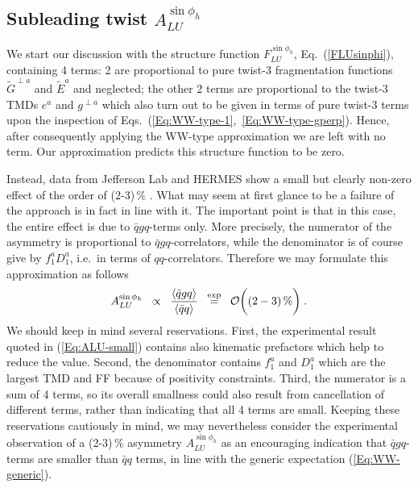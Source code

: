 \documentclass[a4paper,11pt]{article}
\newcommand{\be}{\begin{equation}}
\newcommand{\ee}{\end{equation}}
\newcommand{\la}{\langle}
\newcommand{\ra}{\rangle}
\begin{document}
\subsection{\boldmath Subleading twist  $A_{LU}^{\sin\phi_h}$}
\label{Sec-7.1:FLU}

We start our discussion with the structure function $F_{LU}^{\sin\phi_h}$,
Eq.~(\ref{FLUsinphi}), containing 4 terms: 
2 are proportional to pure twist-3 fragmentation functions 
$\tilde{G}^{\perp a}$ and $\tilde{E}^a$ and neglected; the other 2
terms are proportional to the twist-3 TMDs $e^a$ and $g^{\perp a}$ which
also turn out to be given in terms of pure twist-3 terms upon the 
inspection of Eqs.~(\ref{Eq:WW-type-1},~\ref{Eq:WW-type-gperp}).
Hence, after consequently applying the WW-type approximation we are left 
with no term. Our approximation predicts this structure function to be zero.

Instead, data from Jefferson Lab and HERMES show a small but 
clearly non-zero effect of the order of (2-3)\,$\%$ 
\cite{Avakian:2003pk,Airapetian:2006rx,Gohn:2009zz,Aghasyan:2011ha,
Adolph:2014pwc,Gohn:2014zbz}.
What may seem at first glance to be a failure of the approach is in 
fact in line with it.
The important point is that in this case, the entire effect is due 
to $\bar qgq$-terms only. More precisely, the numerator of the 
asymmetry is proportional to $\bar q g q$-correlators, while the 
denominator is of course give by $f_1^aD_1^a$, i.e.\ in terms of
$q q$-correlators. Therefore we may formulate this approximation 
as follows
\be\label{Eq:ALU-small}
    A_{LU}^{\sin\phi_h}  
	\;\; \propto \;\;\frac{\la\bar qgq\ra}{\la\bar qq\ra}
    	\;\;\stackrel{\rm exp}{=} \;\; 
	{\cal O}\biggl( (2-3)\,\%\biggr)
    	\;.
\ee
We should keep in mind several reservations. First,
the experimental result quoted in (\ref{Eq:ALU-small})
contains also kinematic prefactors which help to reduce the value. 
Second, the denominator contains $f_1^a$ and $D_1^a$ which are the
largest TMD and FF because of positivity constraints. Third, the 
numerator is a sum of 4 terms, so its overall smallness could also 
result from cancellation of different terms, rather than indicating
that all 4 terms are small.
Keeping these reservations cautiously in mind, we may nevertheless 
consider the experimental observation of a (2-3)\,$\%$ asymmetry 
$A_{LU}^{\sin\phi_h}$ 
\cite{Avakian:2003pk,Airapetian:2006rx,Gohn:2009zz,Aghasyan:2011ha,
Adolph:2014pwc,Gohn:2014zbz}
as an encouraging indication that $\bar qgq$-terms are smaller than 
$\bar qq$ terms, in line with the generic expectation (\ref{Eq:WW-generic}).
\end{document}
